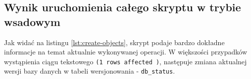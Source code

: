 \subsection{Wynik uruchomienia całego skryptu w trybie wsadowym}

Jak widać na listingu \ref{lst:create-objects}, skrypt podaje bardzo dokładne informacje na temat aktualnie wykonywanej operacji. W większości przypadków wystąpienia ciągu tekstowego \texttt{(1 rows affected )}, następuje zmiana aktualnej wersji bazy danych w tabeli wersjonowania - \texttt{db\_status}.

